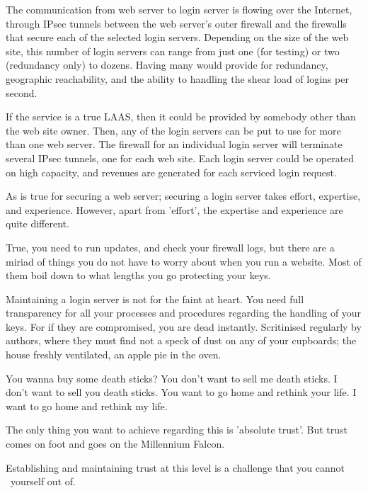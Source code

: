 \par
The communication from web server to login server is flowing over the Internet,
through IPsec tunnels between the web server's outer firewall and the firewalls that secure each of the selected login servers.
Depending on the size of the web site, this number of login servers can range from just one (for testing) or two (redundancy only) to dozens.
Having many would provide for redundancy, geographic reachability, and the ability to handling the shear load of logins per second.
\par
If the service is a true LAAS, then it could be provided by somebody other than the web site owner.
Then, any of the login servers can be put to use for more than one web server.
The firewall for an individual login server will terminate several IPsec tunnels, one for each web site.
Each login server could be operated on high capacity, and revenues are generated for each serviced login request.
\par
{}
As is true for securing a web server; securing a login server takes effort, expertise, and experience.
However, apart from 'effort', the expertise and experience are quite different.
\par
True, you need to run updates, and check your firewall logs, but there are a miriad of things you do not have to worry about when you run a website.
Most of them boil down to what lengths you go protecting your keys.
\par
Maintaining a login server is not for the faint at heart.
You need full transparency for all your processes and procedures regarding the handling of your keys.
For if they are compromised, you are dead instantly.
Scritinised regularly by authors, where they must find not a speck of dust on any of your cupboards; the house freshly ventilated, an apple pie in the oven.
\begin{dialogue}
 You wanna buy some death sticks?
	 You don't want to sell me death sticks.
	I don't want to sell you death sticks.
 You want to go home and rethink your life.
	I want to go home and rethink my life.
\end{dialogue}
The only thing you want to achieve regarding this is 'absolute trust'.
But trust comes on foot and goes on the Millennium Falcon.
\par
Establishing and maintaining trust at this level is a challenge that you cannot \XOR\ yourself out of.
